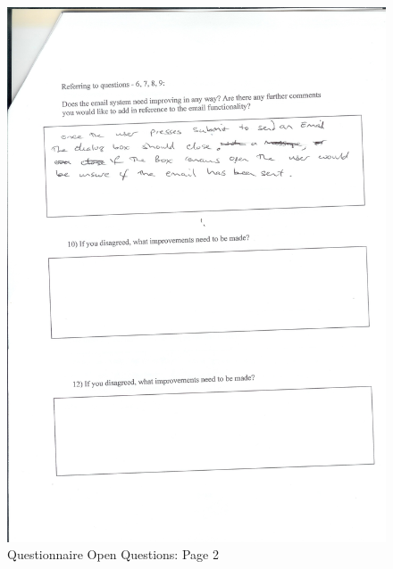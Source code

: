 \begin{figure}[H]
    \includegraphics[width=\textwidth]{./Evaluation/EvaluationQuestionnaire/Scan13.jpeg}
    \caption{Questionnaire Open Questions: Page 2} 
\end{figure}

